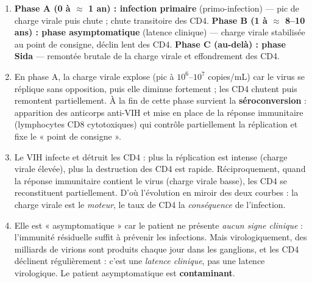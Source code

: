 \documentclass[11pt]{article}
\begin{document}
\begin{corrige}
\begin{enumerate}
    \item \textbf{Phase A (0 à $\approx$ 1 an) : infection primaire} (primo-infection) — pic de charge virale puis chute ; chute transitoire des CD4. \textbf{Phase B (1 à $\approx$ 8--10 ans) : phase asymptomatique} (latence clinique) — charge virale stabilisée au point de consigne, déclin lent des CD4. \textbf{Phase C (au-delà) : phase Sida} — remontée brutale de la charge virale et effondrement des CD4.
    \item En phase A, la charge virale explose (pic à $10^6$--$10^7$ copies/mL) car le virus se réplique sans opposition, puis elle diminue fortement ; les CD4 chutent puis remontent partiellement. À la fin de cette phase survient la \textbf{séroconversion} : apparition des anticorps anti-VIH et mise en place de la réponse immunitaire (lymphocytes CD8 cytotoxiques) qui contrôle partiellement la réplication et fixe le « point de consigne ».
    \item Le VIH infecte et détruit les CD4 : plus la réplication est intense (charge virale élevée), plus la destruction des CD4 est rapide. Réciproquement, quand la réponse immunitaire contient le virus (charge virale basse), les CD4 se reconstituent partiellement. D'où l'évolution en miroir des deux courbes : la charge virale est le \emph{moteur}, le taux de CD4 la \emph{conséquence} de l'infection.
    \item Elle est « asymptomatique » car le patient ne présente \emph{aucun signe clinique} : l'immunité résiduelle suffit à prévenir les infections. Mais virologiquement, des milliards de virions sont produits chaque jour dans les ganglions, et les CD4 déclinent régulièrement : c'est une \emph{latence clinique}, pas une latence virologique. Le patient asymptomatique est \textbf{contaminant}.
\end{enumerate}
\end{corrige}
\end{document}
